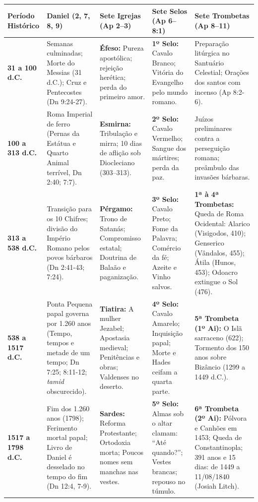 \begin{table}[htbp]
\centering
\footnotesize
\setlength{\tabcolsep}{5pt}
\renewcommand{\arraystretch}{1.25}
\begin{tabularx}{\textwidth}{>{\raggedright\arraybackslash}p{} >{\raggedright\arraybackslash}X >{\raggedright\arraybackslash}X >{\raggedright\arraybackslash}X >{\raggedright\arraybackslash}X}
\toprule
\textbf{Período Histórico} & \textbf{Daniel (2, 7, 8, 9)} & \textbf{Sete Igrejas (Ap 2–3)} & \textbf{Sete Selos (Ap 6–8:1)} & \textbf{Sete Trombetas (Ap 8–11)} \\
\midrule
\textbf{31 a 100 d.C.} & 70 Semanas culminadas; Morte do Messias (31 d.C.); Cruz e Pentecostes (Dn 9:24-27). & \textbf{Éfeso:} Pureza apostólica; rejeição herética; perda do primeiro amor. & \textbf{1º Selo:} Cavalo Branco; Vitória do Evangelho pelo mundo romano. & Preparação litúrgica no Santuário Celestial; Orações dos santos com incenso (Ap 8:2-6). \\
\addlinespace[3pt]
\textbf{100 a 313 d.C.} & Roma Imperial de ferro (Pernas da Estátua e Quarto Animal terrível, Dn 2:40; 7:7). & \textbf{Esmirna:} Tribulação e mirra; 10 dias de aflição sob Diocleciano (303–313). & \textbf{2º Selo:} Cavalo Vermelho; Sangue dos mártires; perda da paz. & Juízos preliminares contra a perseguição romana; preâmbulo das invasões bárbaras. \\
\addlinespace[3pt]
\textbf{313 a 538 d.C.} & Transição para os 10 Chifres; divisão do Império Romano pelos povos bárbaros (Dn 2:41-43; 7:24). & \textbf{Pérgamo:} Trono de Satanás; Compromisso estatal; Doutrina de Balaão e paganização. & \textbf{3º Selo:} Cavalo Preto; Fome da Palavra; Comércio da fé; Azeite e Vinho salvos. & \textbf{1ª à 4ª Trombetas:} Queda de Roma Ocidental: Alarico (Visigodos, 410); Genserico (Vândalos, 455); Átila (Hunos, 453); Odoacro extingue o Sol (476). \\
\addlinespace[3pt]
\textbf{538 a 1517 d.C.} & Ponta Pequena papal governa por 1.260 anos (Tempo, tempos e metade de um tempo; Dn 7:25; 8:11-12; \textit{tamid} obscurecido). & \textbf{Tiatira:} A mulher Jezabel; Apostasia medieval; Penitências e obras; Valdenses no deserto. & \textbf{4º Selo:} Cavalo Amarelo; Inquisição papal; Morte e Hades ceifam a quarta parte. & \textbf{5ª Trombeta (1º Ai):} O Islã sarraceno (622); Tormento dos 150 anos sobre Bizâncio (1299 a 1449 d.C.). \\
\addlinespace[3pt]
\textbf{1517 a 1798 d.C.} & Fim dos 1.260 anos (1798); Ferimento mortal papal; Livro de Daniel é desselado no tempo do fim (Dn 12:4, 7-9). & \textbf{Sardes:} Reforma Protestante; Ortodoxia morta; Poucos nomes sem manchas nas vestes. & \textbf{5º Selo:} Almas sob o altar clamam: ``Até quando?''; Vestes brancas; repouso no túmulo. & \textbf{6ª Trombeta (2º Ai):} Pólvora e Canhões em 1453; Queda de Constantinopla; 391 anos e 15 dias: de 1449 a 11/08/1840 (Josiah Litch). \\

\end{tabularx}
\end{table}
